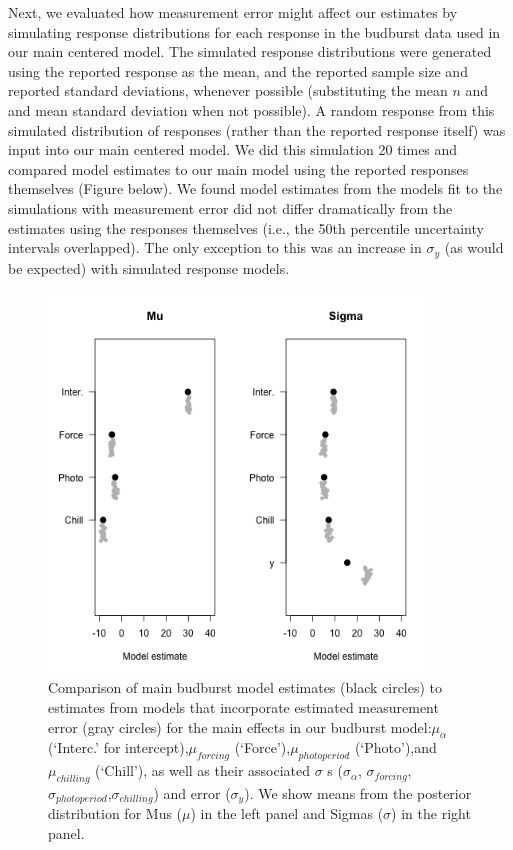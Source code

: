 \documentclass{article}
\begin{document}
Next, we evaluated how measurement error might affect our estimates by simulating response distributions for each response in the budburst data used in our main centered model. The simulated response distributions were generated using the reported response as the mean, and the reported sample size and reported standard deviations, whenever possible (substituting the mean $n$ and and mean standard deviation when not possible). A random response from this simulated distribution of responses (rather than the reported response itself) was input into our main centered model. We did this simulation 20 times and compared model estimates to our main model using the reported responses themselves (Figure below). We found model estimates from the models fit to the simulations with measurement error did not differ dramatically from the estimates using the responses themselves (i.e., the 50th percentile uncertainty intervals overlapped). The only exception to this was an increase in $\sigma_{y}$ (as would be expected) with simulated response models.\\
\begin{figure}[h!]
\centering
\noindent \includegraphics[width=0.9\textwidth]{..//..//..//..//analyses/bb_analysis/figures/measerrcomp.png}
\caption{Comparison of main budburst model estimates (black circles) to estimates from models that incorporate estimated measurement error (gray circles) for the main effects in our budburst model:$\mu_{\alpha}$ (`Interc.' for intercept),$\mu_{forcing}$ (`Force'),$\mu_{photoperiod}$ (`Photo'),and $\mu_{chilling}$ (`Chill'), as well as their associated $\sigma$ s ($\sigma_{\alpha}$, $\sigma_{forcing}$, $\sigma_{photoperiod}$,$\sigma_{chilling}$) and error ($\sigma_{y}$). We show means from the posterior distribution for Mus ($\mu$) in the left panel and Sigmas ($\sigma$) in the right panel.}
\label{fig:measerr}
\end{figure}
\end{document}
